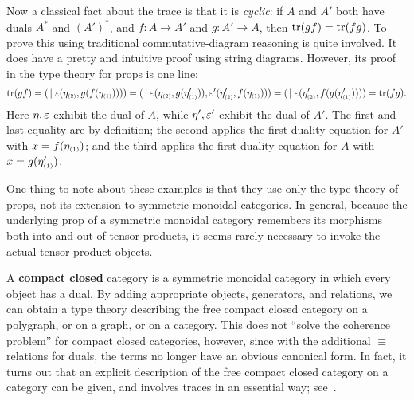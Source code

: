 \begin{props}
Now a classical fact about the trace is that it is \emph{cyclic}: if $A$ and $A'$ both have duals $A^*$ and $(A')^*$, and $f:A\to A'$ and $g:A'\to A$, then $\mathrm{tr}(gf) = \mathrm{tr}(fg)$.
To prove this using traditional commutative-diagram reasoning is quite involved.
It does have a pretty and intuitive proof using string diagrams.
However, its proof in the type theory for props is one line:
\[ \mathrm{tr}(gf) = (\,\mid \varepsilon(\eta_{\scriptscriptstyle(2)},g(f(\eta_{\scriptscriptstyle(1)}))))
= (\,\mid \varepsilon(\eta_{\scriptscriptstyle(2)},g(\eta'_{\scriptscriptstyle(1)})),\varepsilon'(\eta'_{\scriptscriptstyle(2)},f(\eta_{\scriptscriptstyle(1)})))
= (\,\mid \varepsilon(\eta'_{\scriptscriptstyle(2)},f(g(\eta'_{\scriptscriptstyle(1)}))))
= \mathrm{tr}(fg).
\]
Here $\eta,\varepsilon$ exhibit the dual of $A$, while $\eta',\varepsilon'$ exhibit the dual of $A'$.
The first and last equality are by definition;
the second applies the first duality equation for $A'$ with $x=f(\eta_{\scriptscriptstyle(1)})$; and the third applies the first duality equation for $A$ with $x=g(\eta'_{\scriptscriptstyle(1)})$.

One thing to note about these examples is that they use only the type theory of props, not its extension to symmetric monoidal categories.
In general, because the underlying prop of a symmetric monoidal category remembers its morphisms both into and out of tensor products, it seems rarely necessary to invoke the actual tensor product objects.

\begin{rmk}
  A \textbf{compact closed} category is a symmetric monoidal category in which every object has a dual.
  By adding appropriate objects, generators, and relations, we can obtain a type theory describing the free compact closed category on a polygraph, or on a graph, or on a category.
  This does not ``solve the coherence problem'' for compact closed categories, however, since with the additional $\equiv$ relations for duals, the terms no longer have an obvious canonical form.
  In fact, it turns out that an explicit description of the free compact closed category on a category can be given, and involves traces in an essential way; see~\cite{kl:cpt}.
\end{rmk}

\end{props}


